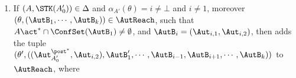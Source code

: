 {\begin{minipage}{0.95\textwidth}
\begin{enumerate}
        then adds the tuple $(\theta', (\AutB_i',\AutB_1',\cdots,\AutB_{i-1},\AutB_{i+1},\cdots,\AutB_{k}))$ to $\AutReach$, such that $\AutB_i' = (\Aut_{A_0'},\Aut_i')$ (resp. $\AutB_i' = (\Aut_{A_0'},\Aut_{i,2}')$), where
        \begin{itemize}
            \item $\theta' = \aname_i\aname_1\dots\aname_{i-1}\aname_{i+1}\dots\aname_k$,
            \item $\Aut_{A_0'} = (Q, \act, \{(q_0, A_0', \tau_{\id}, q_f)\}$, $\{q_0\},\{q_f\})$,
            \item $\AutB_1'$ is obtained from $\AutB_1$ by 
                removing all non-$A$ transitions out of $q_0$, then removing all transitions that cannot be reached from $q_0$.
            \item $\Aut_i'$ is obtained from $\Aut_i''^{\post^*}$ by removing all non-$A''$ transitions out of $q_0$, then removing all transitions that cannot be reached from $q_0$.
            \item $\Aut_i''$ is obtained from $\Aut_i$ by adding the transitions $(q_0,A'',\tau'\circ\tau,q)$ for each $q_0\xRightarrow[\Aut_{A_0'}^{\post^*}]{\epsilon | \tau'} q_f$ and $q_0 \xRightarrow[\Aut_i]{A'' | \tau} q$.
        \end{itemize}
    \item If $(A,\STK(A_0')) \in\Delta$ and $\alpha_{A'}(\theta) = i \neq\bot$ and $i\neq 1$, moreover $(\theta, (\AutB_1,\cdots,\AutB_k)) \in \AutReach$, such that $A\act^*\cap\ConfSet(\AutB_1)\neq \emptyset$, and $\AutB_i=(\Aut_{i,1},\Aut_{i,2})$,
        then adds the tuple $(\theta', ((\Aut_{A_0'}^{\post^*},\Aut_{i,2}),\AutB_1',\cdots,\AutB_{i-1},\AutB_{i+1},\cdots,\AutB_{k}))$ to $\AutReach$, where
        \begin{itemize}

\end{itemize}
\end{enumerate}
\end{minipage}}

